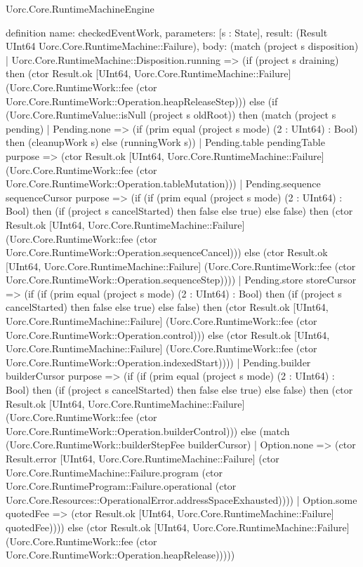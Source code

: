 \begin{lexlean}{Uorc.Core.RuntimeMachineEngine}
\begin{semanticmodule}
definition{
  name: checkedEventWork,
  parameters: [s : State],
  result: (Result UInt64 Uorc.Core.RuntimeMachine::Failure),
  body: (match (project s disposition)
    | Uorc.Core.RuntimeMachine::Disposition.running => (if (project s draining) then (ctor Result.ok [UInt64, Uorc.Core.RuntimeMachine::Failure] (Uorc.Core.RuntimeWork::fee (ctor Uorc.Core.RuntimeWork::Operation.heapReleaseStep))) else (if (Uorc.Core.RuntimeValue::isNull (project s oldRoot)) then (match (project s pending)
      | Pending.none => (if (prim equal (project s mode) (2 : UInt64) : Bool) then (cleanupWork s) else (runningWork s))
      | Pending.table pendingTable purpose => (ctor Result.ok [UInt64, Uorc.Core.RuntimeMachine::Failure] (Uorc.Core.RuntimeWork::fee (ctor Uorc.Core.RuntimeWork::Operation.tableMutation)))
      | Pending.sequence sequenceCursor purpose => (if (if (prim equal (project s mode) (2 : UInt64) : Bool) then (if (project s cancelStarted) then false else true) else false) then (ctor Result.ok [UInt64, Uorc.Core.RuntimeMachine::Failure] (Uorc.Core.RuntimeWork::fee (ctor Uorc.Core.RuntimeWork::Operation.sequenceCancel))) else (ctor Result.ok [UInt64, Uorc.Core.RuntimeMachine::Failure] (Uorc.Core.RuntimeWork::fee (ctor Uorc.Core.RuntimeWork::Operation.sequenceStep))))
      | Pending.store storeCursor => (if (if (prim equal (project s mode) (2 : UInt64) : Bool) then (if (project s cancelStarted) then false else true) else false) then (ctor Result.ok [UInt64, Uorc.Core.RuntimeMachine::Failure] (Uorc.Core.RuntimeWork::fee (ctor Uorc.Core.RuntimeWork::Operation.control))) else (ctor Result.ok [UInt64, Uorc.Core.RuntimeMachine::Failure] (Uorc.Core.RuntimeWork::fee (ctor Uorc.Core.RuntimeWork::Operation.indexedStart))))
      | Pending.builder builderCursor purpose => (if (if (prim equal (project s mode) (2 : UInt64) : Bool) then (if (project s cancelStarted) then false else true) else false) then (ctor Result.ok [UInt64, Uorc.Core.RuntimeMachine::Failure] (Uorc.Core.RuntimeWork::fee (ctor Uorc.Core.RuntimeWork::Operation.builderControl))) else (match (Uorc.Core.RuntimeWork::builderStepFee builderCursor)
        | Option.none => (ctor Result.error [UInt64, Uorc.Core.RuntimeMachine::Failure] (ctor Uorc.Core.RuntimeMachine::Failure.program (ctor Uorc.Core.RuntimeProgram::Failure.operational (ctor Uorc.Core.Resources::OperationalError.addressSpaceExhausted))))
        | Option.some quotedFee => (ctor Result.ok [UInt64, Uorc.Core.RuntimeMachine::Failure] quotedFee)))) else (ctor Result.ok [UInt64, Uorc.Core.RuntimeMachine::Failure] (Uorc.Core.RuntimeWork::fee (ctor Uorc.Core.RuntimeWork::Operation.heapRelease)))))
}
\end{semanticmodule}
\end{lexlean}
